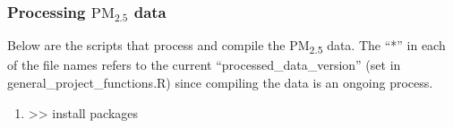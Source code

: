 
\subsubsection{Processing $\textrm{PM}_{2.5}$ data}

Below are the scripts that process and compile the PM\textsubscript{2.5} data. The ``*'' in each of the file names refers to the current ``processed\_data\_version'' (set in general\_project\_functions.R)  since compiling the data is an ongoing process. 

\begin{enumerate}[nolistsep]
\item {} >> install packages


\end{enumerate}

